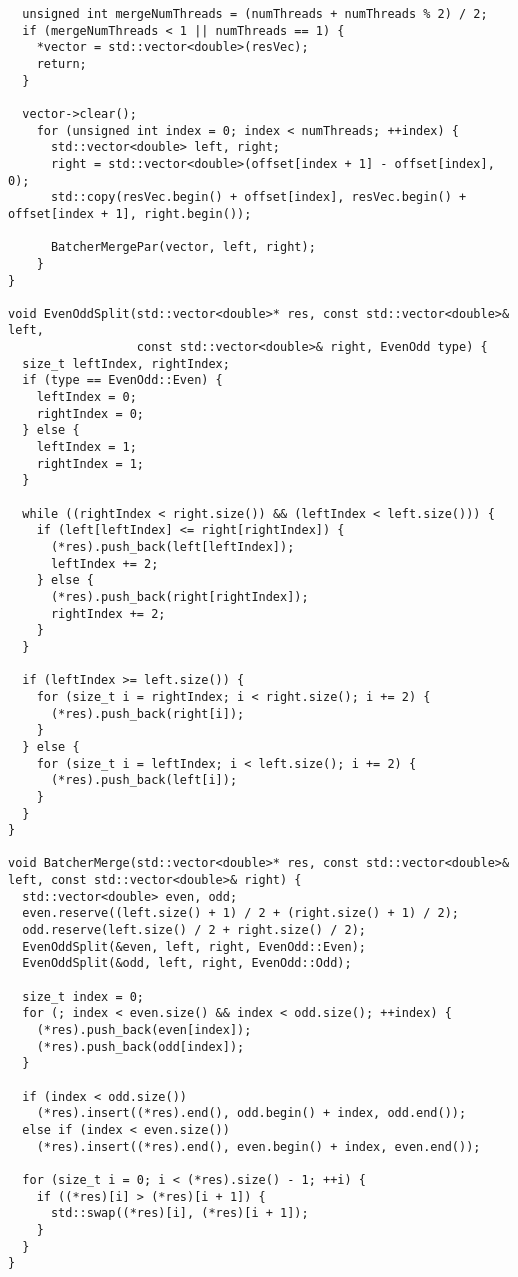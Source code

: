 \documentclass{report}
\begin{document}
\begin{lstlisting}
  unsigned int mergeNumThreads = (numThreads + numThreads % 2) / 2;
  if (mergeNumThreads < 1 || numThreads == 1) {
    *vector = std::vector<double>(resVec);
    return;
  }

  vector->clear();
    for (unsigned int index = 0; index < numThreads; ++index) {
      std::vector<double> left, right;
      right = std::vector<double>(offset[index + 1] - offset[index], 0);
      std::copy(resVec.begin() + offset[index], resVec.begin() + offset[index + 1], right.begin());

      BatcherMergePar(vector, left, right);
    }
}

void EvenOddSplit(std::vector<double>* res, const std::vector<double>& left,
                  const std::vector<double>& right, EvenOdd type) {
  size_t leftIndex, rightIndex;
  if (type == EvenOdd::Even) {
    leftIndex = 0;
    rightIndex = 0;
  } else {
    leftIndex = 1;
    rightIndex = 1;
  }

  while ((rightIndex < right.size()) && (leftIndex < left.size())) {
    if (left[leftIndex] <= right[rightIndex]) {
      (*res).push_back(left[leftIndex]);
      leftIndex += 2;
    } else {
      (*res).push_back(right[rightIndex]);
      rightIndex += 2;
    }
  }

  if (leftIndex >= left.size()) {
    for (size_t i = rightIndex; i < right.size(); i += 2) {
      (*res).push_back(right[i]);
    }
  } else {
    for (size_t i = leftIndex; i < left.size(); i += 2) {
      (*res).push_back(left[i]);
    }
  }
}

void BatcherMerge(std::vector<double>* res, const std::vector<double>& left, const std::vector<double>& right) {
  std::vector<double> even, odd;
  even.reserve((left.size() + 1) / 2 + (right.size() + 1) / 2);
  odd.reserve(left.size() / 2 + right.size() / 2);
  EvenOddSplit(&even, left, right, EvenOdd::Even);
  EvenOddSplit(&odd, left, right, EvenOdd::Odd);

  size_t index = 0;
  for (; index < even.size() && index < odd.size(); ++index) {
    (*res).push_back(even[index]);
    (*res).push_back(odd[index]);
  }

  if (index < odd.size())
    (*res).insert((*res).end(), odd.begin() + index, odd.end());
  else if (index < even.size())
    (*res).insert((*res).end(), even.begin() + index, even.end());

  for (size_t i = 0; i < (*res).size() - 1; ++i) {
    if ((*res)[i] > (*res)[i + 1]) {
      std::swap((*res)[i], (*res)[i + 1]);
    }
  }
}


\end{lstlisting}
\end{document}
